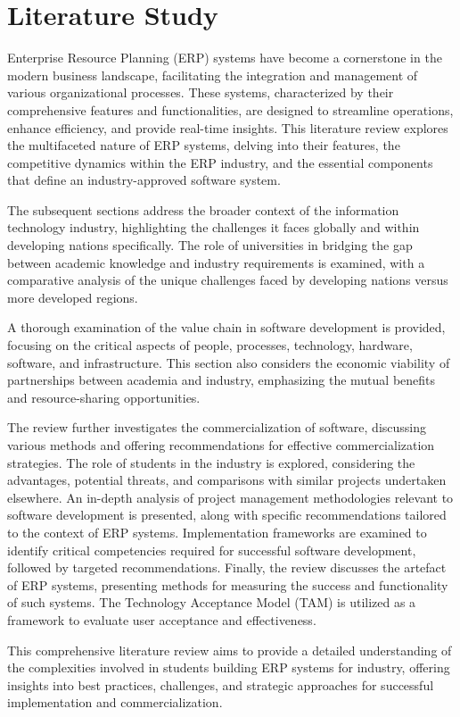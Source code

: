 \chapter{Literature Study}
\par{Enterprise Resource Planning (ERP) systems have become a cornerstone in the modern business
landscape, facilitating the integration and management of various organizational processes. 
These systems, characterized by their comprehensive features and functionalities, are designed 
to streamline operations, enhance efficiency, and provide real-time insights. This literature 
review explores the multifaceted nature of ERP systems, delving into their features, the 
competitive dynamics within the ERP industry, and the essential components that define an 
industry-approved software system.

The subsequent sections address the broader context of the information technology industry, 
highlighting the challenges it faces globally and within developing nations specifically. The role 
of universities in bridging the gap between academic knowledge and industry requirements is 
examined, with a comparative analysis of the unique challenges faced by developing nations versus 
more developed regions.

A thorough examination of the value chain in software development is provided, focusing on 
the critical aspects of people, processes, technology, hardware, software, and infrastructure. 
This section also considers the economic viability of partnerships between academia and industry, 
emphasizing the mutual benefits and resource-sharing opportunities.

The review further investigates the commercialization of software, discussing various methods 
and offering recommendations for effective commercialization strategies. The role of students in the
industry is explored, considering the advantages, potential threats, and comparisons with similar 
projects undertaken elsewhere. An in-depth analysis of project management methodologies relevant to software development is presented, along with specific recommendations tailored to the context of ERP systems. Implementation frameworks are examined to identify critical competencies required for successful 
software development, followed by targeted recommendations. Finally, the review discusses the artefact of ERP systems, presenting methods for measuring the success and functionality of such systems. The Technology Acceptance Model (TAM) is utilized as a framework to evaluate user acceptance and effectiveness.

This comprehensive literature review aims to provide a detailed understanding of the 
complexities involved in students building ERP systems for industry, offering insights into best 
practices, challenges, and strategic approaches for successful implementation and commercialization.}

